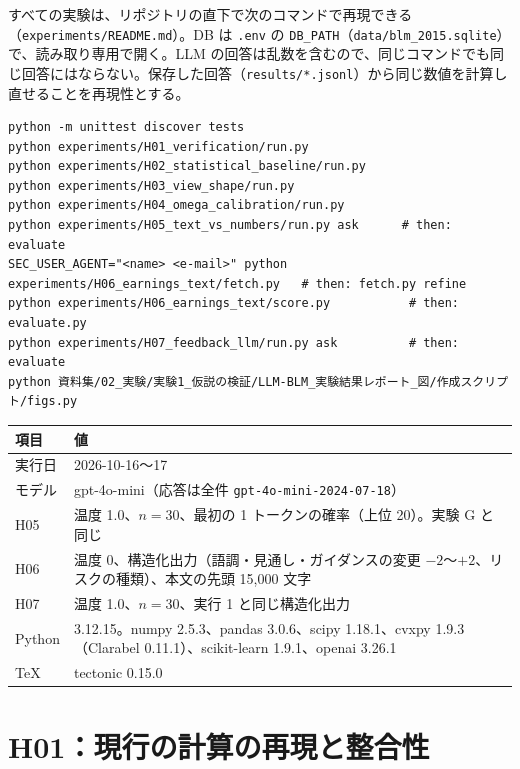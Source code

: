 \documentclass[xelatex,ja=standard,jafont=haranoaji,a4paper,10pt,openany]{bxjsreport}
\newcommand{\code}[1]{\texttt{#1}}
\begin{document}
すべての実験は、リポジトリの直下で次のコマンドで再現できる（\code{experiments/README.md}）。DB は \code{.env} の \code{DB\_PATH}（\code{data/blm\_2015.sqlite}）で、読み取り専用で開く。LLM の回答は乱数を含むので、同じコマンドでも同じ回答にはならない。保存した回答（\code{results/*.jsonl}）から同じ数値を計算し直せることを再現性とする。

\begin{lstlisting}[basicstyle=\ttfamily\scriptsize,frame=single,breaklines=true]
python -m unittest discover tests
python experiments/H01_verification/run.py
python experiments/H02_statistical_baseline/run.py
python experiments/H03_view_shape/run.py
python experiments/H04_omega_calibration/run.py
python experiments/H05_text_vs_numbers/run.py ask      # then: evaluate
SEC_USER_AGENT="<name> <e-mail>" python experiments/H06_earnings_text/fetch.py   # then: fetch.py refine
python experiments/H06_earnings_text/score.py           # then: evaluate.py
python experiments/H07_feedback_llm/run.py ask          # then: evaluate
python 資料集/02_実験/実験1_仮説の検証/LLM-BLM_実験結果レポート_図/作成スクリプト/figs.py
\end{lstlisting}

\begin{longtable}{p{2.6cm}p{12.3cm}}
\toprule
\textbf{項目} & \textbf{値} \\
\midrule
\endfirsthead
\bottomrule
\endfoot
実行日 & 2026-10-16〜17 \\
モデル & gpt-4o-mini（応答は全件 \code{gpt-4o-mini-2024-07-18}） \\
H05 & 温度 1.0、$n=30$、最初の 1 トークンの確率（上位 20）。実験 G と同じ \\
H06 & 温度 0、構造化出力（語調・見通し・ガイダンスの変更 $-2$〜$+2$、リスクの種類）、本文の先頭 15,000 文字 \\
H07 & 温度 1.0、$n=30$、実行 1 と同じ構造化出力 \\
Python & 3.12.15。numpy 2.5.3、pandas 3.0.6、scipy 1.18.1、cvxpy 1.9.3（Clarabel 0.11.1）、scikit-learn 1.9.1、openai 3.26.1 \\
TeX & tectonic 0.15.0 \\
\end{longtable}

\chapter{H01：現行の計算の再現と整合性}\label{ch:h01}
\end{document}
